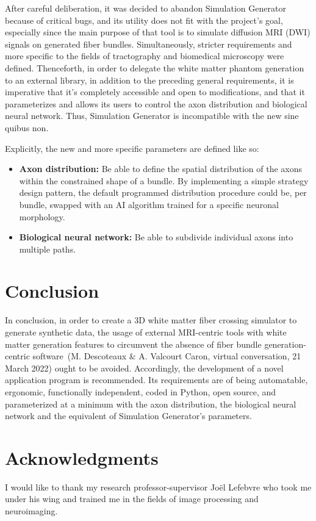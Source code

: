 \documentclass{article}
\begin{document}
  After careful deliberation, it was decided to abandon Simulation Generator because of critical bugs, and its utility does not fit with the project's goal, especially since the main purpose of that tool is to simulate diffusion MRI (DWI) signals on generated fiber bundles.
  Simultaneously, stricter requirements and more specific to the fields of tractography and biomedical microscopy were defined.
  Thenceforth, in order to delegate the white matter phantom generation to an external library, in addition to the preceding general requirements, it is imperative that it's completely accessible and open to modifications, and that it parameterizes and allows its users to control the axon distribution and biological neural network.
  Thus, Simulation Generator is incompatible with the new sine quibus non.

  Explicitly, the new and more specific parameters are defined like so:
  \begin{itemize}
    \item \textbf{Axon distribution:} Be able to define the spatial distribution of the axons within the constrained shape of a bundle.
    By implementing a simple strategy design pattern, the default programmed distribution procedure could be, per bundle, swapped with an AI algorithm trained for a specific neuronal morphology.
    \item \textbf{Biological neural network:} Be able to subdivide individual axons into multiple paths.
  \end{itemize}


  \section{Conclusion}\label{sec:conclusion}

  In conclusion, in order to create a 3D white matter fiber crossing simulator to generate synthetic data, the usage of external MRI-centric tools with white matter generation features to circumvent the absence of fiber bundle generation-centric software~\nocite{descoteauxvalcourtcaron2022othertoolsthanfiberfox}(M. Descoteaux \& A. Valcourt Caron, virtual conversation, 21 March 2022) ought to be avoided.
  Accordingly, the development of a novel application program is recommended.
  Its requirements are of being automatable, ergonomic, functionally independent, coded in Python, open source, and parameterized at a minimum with the axon distribution, the biological neural network and the equivalent of Simulation Generator's parameters.


  \section*{Acknowledgments}\label{sec:thanks}

  I would like to thank my research professor-supervisor Joël Lefebvre who took me under his wing and trained me in the fields of image processing and neuroimaging.


  
  
\end{document}

